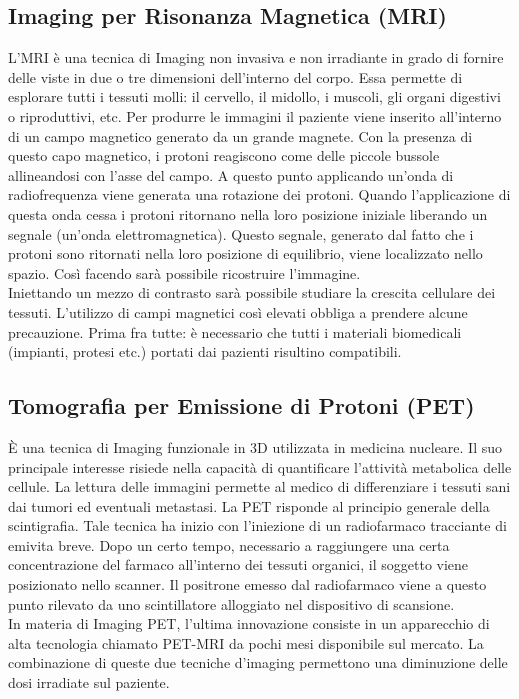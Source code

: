 \documentclass[a4paper]{article}
\begin{document}
\subsection{Imaging per Risonanza Magnetica (MRI)}
L’MRI è una tecnica di Imaging non invasiva e non irradiante in grado di 
fornire delle viste in due o tre dimensioni dell’interno del corpo. Essa 
permette di esplorare tutti i tessuti molli: il cervello, il midollo, i
muscoli, gli organi digestivi o riproduttivi, etc.
Per produrre le immagini il paziente viene inserito all’interno di un campo 
magnetico generato da un grande magnete. Con la presenza di questo capo 
magnetico, i protoni reagiscono come delle piccole bussole allineandosi con 
l’asse del campo. A questo punto applicando un’onda di radiofrequenza viene 
generata una rotazione dei protoni. Quando l’applicazione di questa onda 
cessa i protoni ritornano nella loro posizione iniziale liberando un segnale
(un’onda elettromagnetica). Questo segnale, generato dal fatto che i protoni 
sono ritornati nella loro posizione di equilibrio, viene localizzato nello 
spazio. Così facendo sarà possibile ricostruire l’immagine. \\
Iniettando un mezzo di contrasto sarà possibile studiare la crescita 
cellulare dei tessuti. L’utilizzo di campi magnetici così elevati obbliga a 
prendere alcune precauzione. Prima fra tutte: è necessario che tutti i 
materiali biomedicali (impianti, protesi etc.) portati dai pazienti risultino 
compatibili.

\subsection{Tomografia per Emissione di Protoni (PET)}
È una tecnica di Imaging funzionale in 3D utilizzata in medicina nucleare. Il 
suo principale interesse risiede nella capacità di quantificare l’attività 
metabolica delle cellule. La lettura delle immagini permette al medico di
differenziare i tessuti sani dai tumori ed eventuali metastasi. La PET 
risponde al principio generale della scintigrafia. Tale tecnica ha inizio 
con l’iniezione di un radiofarmaco tracciante di emivita breve. Dopo un 
certo tempo, necessario a raggiungere una certa concentrazione del farmaco 
all’interno dei tessuti organici, il soggetto viene posizionato nello scanner. 
Il positrone emesso dal radiofarmaco viene a questo punto rilevato da uno 
scintillatore alloggiato nel dispositivo di scansione. \\
In materia di Imaging PET, l’ultima innovazione consiste in un apparecchio di 
alta tecnologia chiamato PET-MRI da pochi mesi disponibile sul mercato. La 
combinazione di queste due tecniche d’imaging permettono una diminuzione 
delle dosi irradiate sul paziente.
\end{document}
